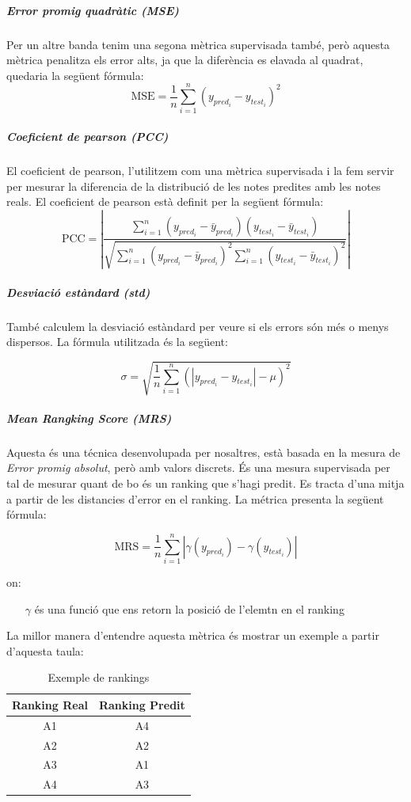 \documentclass[12pt,a4paper,catalan]{article}
\begin{document}
\subparagraph{Error promig quadràtic (MSE)}
Per un altre banda tenim una segona mètrica supervisada també, però aquesta mètrica penalitza els error alts, ja que la diferència es elavada al quadrat, quedaria la següent fórmula:
$$\mathrm{MSE}=\frac{1}{n}\sum_{i=1}^n(y_{pred_i}-y_{test_i})^2$$

\subparagraph{Coeficient de pearson (PCC)}
El coeficient de pearson, l'utilitzem com una mètrica supervisada i la fem servir per mesurar la diferencia de la distribució de les notes predites amb les notes reals. El coeficient de pearson està definit per la següent fórmula:
$$\mathrm{PCC} =\left| \frac{\sum_{i=1}^n(y_{pred_i} - \bar{y}_{pred_i})(y_{test_i} - \bar{y}_{test_i})}{\sqrt{\sum_{i=1}^n(y_{pred_i} - \bar{y}_{pred_i})^2  \sum_{i=1}^n(y_{test_i} - \bar{y}_{test_i})^2}}\right|$$

\subparagraph{Desviació estàndard (std)}
També calculem la desviació estàndard per veure si els errors són més o menys dispersos. La fórmula utilitzada és la següent:

$$ \sigma = \sqrt{ \frac{1}{n} \sum_{i=1}^n (\left| y_{pred_i}-y_{test_i}\right| - \mu)^2 } $$

\subparagraph{\textit{Mean Rangking Score (MRS)}}
Aquesta és una técnica desenvolupada per nosaltres, està basada en la mesura de \textit{Error promig absolut}, però amb valors discrets. És una mesura supervisada per tal de mesurar quant de bo és un ranking que s'hagi predit. Es tracta d'una mitja a partir de les distancies d'error en el ranking. La métrica presenta la següent fórmula:

$$ \mathrm{MRS} = \frac{1}{n}\sum_{i=1}^n \left| \gamma(y_{pred_i}) -  \gamma(y_{test_i})\right| $$

on:
\begin{itemize}[leftmargin=.5in]
	\item [$\gamma$] és una funció que ens retorn la posició de l'elemtn en el ranking
\end{itemize}

\newpage

La millor manera d'entendre aquesta mètrica és mostrar un exemple a partir d'aquesta taula:

\begin{table}[h]
\centering
\label{my-label}
\begin{tabular}{@{}cc@{}}
\toprule
Ranking Real & Ranking Predit \\ \midrule
A1           & A4             \\
A2           & A2             \\
A3           & A1             \\
A4           & A3             \\ \bottomrule
\end{tabular}
\caption{Exemple de rankings}
\end{table}
\end{document}
